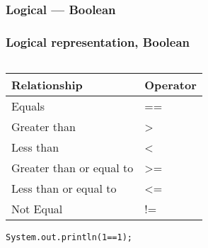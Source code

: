 \documentclass[
  11pt, %
  xcolor=dvipsnames
]{beamer}
\begin{document}
\subsubsection{Logical --- Boolean}
\begin{frame}[fragile]
	\frametitle{Logical representation, Boolean}


	\begin{columns}[c]
		\begin{column}{0.9\textwidth}

			\begin{table}
				\begin{tabular}{l l}
					\toprule
					Relationship             & Operator \\
					\midrule
					Equals                   & ==       \\
					Greater than             & >        \\
					Less than                & <        \\
					Greater than or equal to & >=       \\
					Less than or equal to    & <=       \\
					Not Equal                & !=       \\
					\bottomrule
				\end{tabular}
			\end{table}

			\begin{lstlisting}[style=Java]
System.out.println(1==1);
      \end{lstlisting}

		\end{column}
	\end{columns}

\end{frame}
\end{document}

